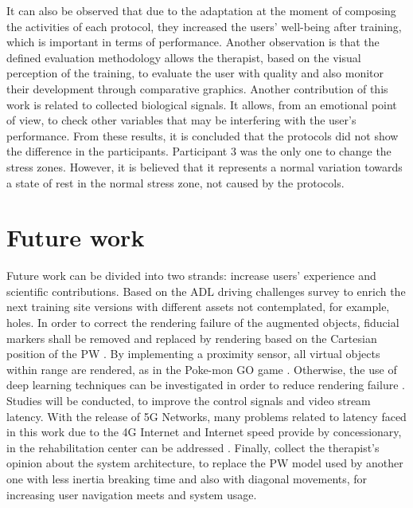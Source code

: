 It can also be observed that due to the adaptation at the moment of composing the activities of each protocol, they increased the users' well-being after training, which is important in terms of performance. Another observation is that the defined evaluation methodology allows the therapist, based on the visual perception of the training, to evaluate the user with quality and also monitor their development through comparative graphics. Another contribution of this work is related to collected biological signals. It allows, from an emotional point of view, to check other variables that may be interfering with the user's performance. From these results, it is concluded that the protocols did not show the difference in the participants. Participant 3 was the only one to change the stress zones. However, it is believed that it represents a normal variation towards a state of rest in the normal stress zone, not caused by the protocols.

\section{Future work} 

Future work can be divided into two strands: increase users’ experience and scientific contributions. Based on the ADL driving challenges survey to enrich the next training site versions with different assets not contemplated, for example, holes. In order to correct the rendering failure of the augmented objects, fiducial markers shall be removed and replaced by rendering based on the Cartesian position of the PW \cite{raul2016}. By implementing a proximity sensor, all virtual objects within range are rendered, as in the Poke-mon GO game \cite{el2019}. Otherwise, the use of deep learning techniques can be investigated in order to reduce rendering failure \cite{mattioli2019}.  Studies will be conducted, to improve the control signals and video stream latency. With the release of 5G Networks, many problems related to latency faced in this work due to the 4G Internet and Internet speed provide by concessionary, in the rehabilitation center can be addressed \cite{rashid2019}. Finally, collect the therapist's opinion about the system architecture, to replace the PW model used by another one with less inertia breaking time and also with diagonal movements, for increasing user navigation meets and system usage.

